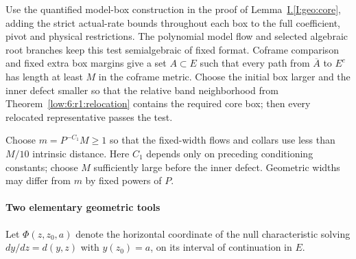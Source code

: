 \documentclass[11pt]{amsart}
\theoremstyle{definition}
\theoremstyle{remark}
\numberwithin{equation}{section}
\newcommand{\partIref}[1]{\hyperref[I:#1]{I.\ref*{I:#1}}}
\begin{document}
Use the quantified model-box construction in the proof of Lemma~\partIref{geo:core}, adding the strict actual-rate bounds throughout each box to the full coefficient, pivot and physical restrictions. The polynomial model flow and selected algebraic root branches keep this test semialgebraic of fixed format. Coframe comparison and fixed extra box margins give a set $A\subset E$ such that every path from $\overline A$ to $E^c$ has length at least $M$ in the coframe metric. Choose the initial box larger and the inner defect smaller so that the relative band neighborhood from Theorem~\ref{low:6:r1:relocation} contains the required core box; then every relocated representative passes the test.

Choose $m=P^{-C_1}M\ge1$ so that the fixed-width flows and collars use less than $M/10$ intrinsic distance. Here $C_1$ depends only on preceding conditioning constants; choose $M$ sufficiently large before the inner defect. Geometric widths may differ from $m$ by fixed powers of $P$.

\paragraph{Two elementary geometric tools}
Let $\Phi(z,z_0,a)$ denote the horizontal coordinate of the null characteristic solving $dy/dz=d(y,z)$ with $y(z_0)=a$, on its interval of continuation in $E$.
\end{document}
